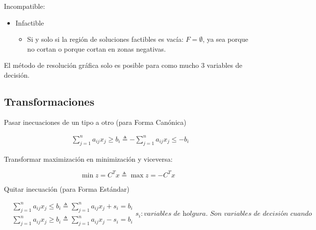 \documentclass[12pt, twoside, openright]{report} %
\begin{document}
	Incompatible: 
	\begin{itemize}
		\item Infactible 
		\begin{itemize}
			\item Si y solo si la región de soluciones
			factibles es vacía: \(F=\emptyset\), ya sea porque no cortan o
			porque cortan en zonas negativas.
			\begin{figure}[H]
				{}
			\end{figure}
		\end{itemize}

	\end{itemize}

	
	
  El método de resolución gráfica solo es posible para como mucho 3
  variables de decisión.
\pagebreak
  \subsection{Transformaciones}

  
  Pasar inecuaciones de un tipo a otro (para Forma Canónica)

  $$\begin{aligned}  &\sum_{j=1}^{n} a_{i j} x_{j} \geqslant b_{i} \triangleq -\sum_{j=1}^{n} a_{i j} x_{j}\leq -b_{i}  \end{aligned}$$

	Transformar maximización en minimización y viceversa:

	
	$$\min z = C^{T}x \triangleq \max z =- C^{T}x$$

  Quitar inecuación (para Forma Estándar)

  $$\begin{aligned}  &\sum_{j=1}^{n} a_{i j} x_{j} \leqslant b_{i} \triangleq \sum_{j=1}^{n} a_{i j} x_{j}+s_{i}=b_{i}\\  &\sum_{j=1}^{n} a_{i j} x_{j} \geqslant b_{i} \triangleq \sum_{j=1}^{n} a_{i j} x_{j}-s_{i}=b_{i}  \end{aligned}s_i: \textit{variables de holgura. Son variables de decisión cuando}$$
  
\end{document}
